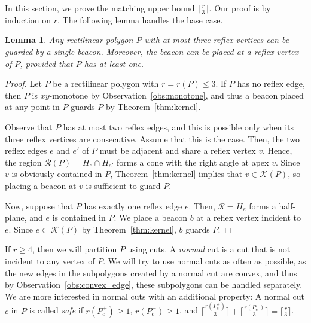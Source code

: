 \documentclass[11pt]{article}
\newcommand{\Kernel}{\mathcal{K}}
\newcommand{\RKernel}{\mathcal{R}}
\newtheorem{lemma}{Lemma}
\theoremstyle{definition}
\let\geq\geqslant
\let\leq\leqslant
\begin{document}
In this section, we prove the matching upper bound $\lceil \frac{r}{3} \rceil$.
Our proof is by induction on $r$.
The following lemma handles the base case.
\begin{lemma} \label{lem:coverage_base}
 Any rectilinear polygon $P$ with at most three reflex vertices can be guarded by
 a single beacon.  Moreover, the beacon  can be placed at a reflex vertex of $P$,
 provided that $P$ has at least one.
\end{lemma}
\begin{proof}
Let $P$ be a rectilinear polygon with $r = r(P) \leq 3$.
If $P$ has no reflex edge, then $P$ is $xy$-monotone by Observation~\ref{obs:monotone},
and thus a beacon placed at any point in $P$ guards $P$
by Theorem~\ref{thm:kernel}.

Observe that $P$ has at most two reflex edges,
and this is possible only when its three reflex vertices are consecutive.
Assume that this is the case.
Then, the two reflex edges $e$ and $e'$ of $P$ must be adjacent and share a reflex vertex $v$.
Hence, the region $\RKernel(P) = H_e \cap H_{e'}$ forms a cone with the right angle at apex $v$.
Since $v$ is obviously contained in $P$,  Theorem~\ref{thm:kernel}
implies that $v\in \Kernel(P)$, so placing a beacon at $v$ is sufficient to guard $P$.

Now, suppose that $P$ has exactly one reflex edge $e$.
Then, $\RKernel = H_e$ forms a half-plane, and $e$ is contained in $P$.
We place a beacon $b$ at a reflex vertex incident to $e$.
Since $e \subset \Kernel(P)$ by Theorem~\ref{thm:kernel},
$b$ guards $P$.
\end{proof}

If $r \geq 4$, then we will partition $P$ using cuts.
A {\it normal} cut is a cut that is not incident to any vertex of $P$.
We will try to use normal cuts as often as possible,
as the new edges in the subpolygons created by a normal cut are convex,
and thus by Observation~\ref{obs:convex_edge},
these subpolygons can be handled separately.
We are more interested in normal cuts with an additional property:
A normal cut $c$ in $P$ is called \emph{safe} if
$r(P^+_c) \geq 1$, $r(P^-_c) \geq 1$, and
$\lceil \frac{r(P^+_c)}{3} \rceil + \lceil \frac{r(P^-_c)}{3} \rceil = \lceil \frac{r}{3} \rceil$.
\end{document}
